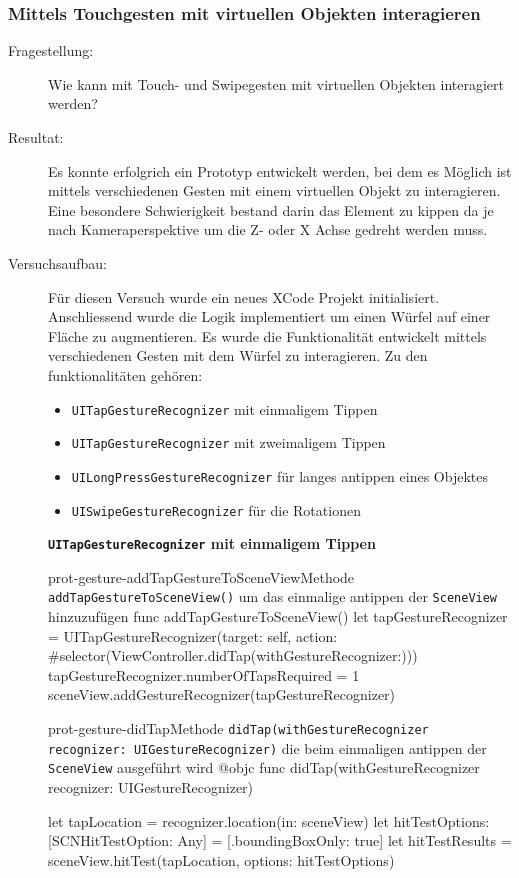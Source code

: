\subsubsection{Mittels Touchgesten mit virtuellen Objekten interagieren}
\begin{description}
	\item[Fragestellung:] Wie kann mit Touch- und Swipegesten mit virtuellen Objekten interagiert werden?
	\item[Resultat:] Es konnte erfolgrich ein Prototyp entwickelt werden, bei dem es Möglich ist mittels verschiedenen Gesten mit einem virtuellen Objekt zu interagieren. Eine besondere Schwierigkeit bestand darin das Element zu kippen da je nach Kameraperspektive um die Z- oder X Achse gedreht werden muss. 
    \item[Versuchsaufbau:] Für diesen Versuch wurde ein neues XCode Projekt initialisiert. Anschliessend wurde die Logik implementiert um einen Würfel auf einer Fläche zu augmentieren. Es wurde die Funktionalität entwickelt mittels verschiedenen Gesten mit dem Würfel zu interagieren. Zu den funktionalitäten gehören:
    
    \begin{itemize}
        \item \texttt{UITapGestureRecognizer} mit einmaligem Tippen
        \item \texttt{UITapGestureRecognizer} mit zweimaligem Tippen
        \item \texttt{UILongPressGestureRecognizer} für langes antippen eines Objektes
        \item \texttt{UISwipeGestureRecognizer} für die Rotationen
    \end{itemize}


    \textbf{\texttt{UITapGestureRecognizer} mit einmaligem Tippen}\\

    \begin{code}{prot-gesture-addTapGestureToSceneView}{Methode \texttt{addTapGestureToSceneView()} um das einmalige antippen der \texttt{SceneView} hinzuzufügen}
    func addTapGestureToSceneView() {
        let tapGestureRecognizer = UITapGestureRecognizer(target: self, action: #selector(ViewController.didTap(withGestureRecognizer:)))
        tapGestureRecognizer.numberOfTapsRequired = 1
        sceneView.addGestureRecognizer(tapGestureRecognizer)
    }
    \end{code}

    \begin{code}{prot-gesture-didTap}{Methode \texttt{didTap(withGestureRecognizer recognizer: UIGestureRecognizer)} die beim einmaligen antippen der \texttt{SceneView} ausgeführt wird}
    @objc
    func didTap(withGestureRecognizer recognizer: UIGestureRecognizer) {
        let tapLocation = recognizer.location(in: sceneView)
        let hitTestOptions: [SCNHitTestOption: Any] = [.boundingBoxOnly: true]
        let hitTestResults = sceneView.hitTest(tapLocation, options: hitTestOptions)

}
\end{code}
\end{description}
